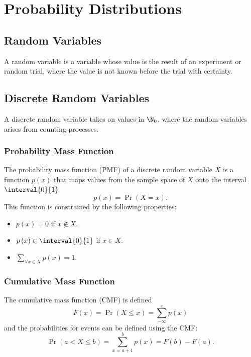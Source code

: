 \documentclass{article}
\begin{document}
\section{Probability Distributions}
\subsection{Random Variables}
A random variable is a variable whose value is the result of an experiment or random trial,
where the value is not known before the trial with certainty.
\subsection{Discrete Random Variables}
\begin{definition}
    A discrete random variable takes on values in \(\N_0\), where the random variables arises from
    counting processes.
\end{definition}
\subsubsection{Probability Mass Function}
The probability mass function (PMF) of a discrete random variable \(X\) is a function \(p\left( x \right)\) that
maps values from the sample space of \(X\) onto the interval \(\interval{0}{1}\).
\begin{equation*}
    p\left( x \right) = \Pr{\left( X = x \right)}.
\end{equation*}
This function is constrained by the following properties:
\begin{itemize}
    \item \(p\left( x \right) = 0\) if \(x \notin X\).
    \item \(p\left( x \right) \in \interval{0}{1}\) if \(x \in X\).
    \item \(\sum_{\forall x \in X} p\left( x \right) = 1\).
\end{itemize}
\subsubsection{Cumulative Mass Function}
The cumulative mass function (CMF) is defined
\begin{equation*}
    F\left( x \right) = \Pr{\left( X \leq x \right)} = \sum_{-\infty}^x p\left( x \right)
\end{equation*}
and the probabilities for events can be defined using the CMF\@:
\begin{equation*}
    \Pr{\left( a < X \leq b \right)} = \sum_{x = a + 1}^b p\left( x \right) = F\left( b \right) - F\left( a \right).
\end{equation*}
\end{document}
